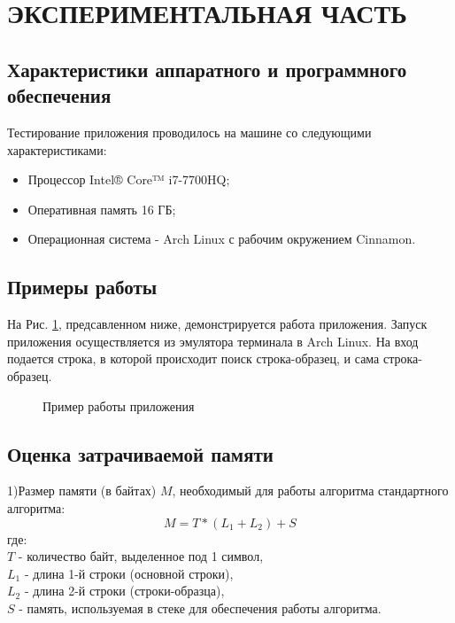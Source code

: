 \documentclass[a4paper,12pt]{article}
\begin{document}
\newpage
\section{ЭКСПЕРИМЕНТАЛЬНАЯ ЧАСТЬ}
\subsection{Характеристики аппаратного и программного обеспечения}
Тестирование приложения проводилось на машине со следующими характеристиками:\\
\begin{itemize}
\item Процессор Intel® Core™ i7-7700HQ;
\item Оперативная память 16 ГБ;
\item Операционная система - Arch Linux с рабочим окружением Cinnamon.
\end{itemize}

\newpage
\subsection{Примеры работы}
На Рис. \ref{images:example}, предсавленном ниже, демонстрируется работа приложения. Запуск приложения осуществляется из эмулятора терминала в Arch Linux. На вход подается 
строка, в которой происходит поиск строка-образец, и сама строка-образец.
\begin{figure}[h]
\caption{Пример работы приложения}
\label{images:example}
\end{figure}

\newpage
\subsection{Оценка затрачиваемой памяти}
1)Размер памяти (в байтах) $M$, необходимый для работы алгоритма стандартного алгоритма:\\
\begin{equation}
M =  T * (L_1 + L_2) + S
\end{equation}
где:\\
$T$ - количество байт, выделенное под 1 символ,\\
$L_1$ - длина 1-й строки (основной строки),\\
$L_2$ - длина 2-й строки (строки-образца),\\
$S$ - память, используемая в стеке для обеспечения работы алгоритма. \\
\end{document}
